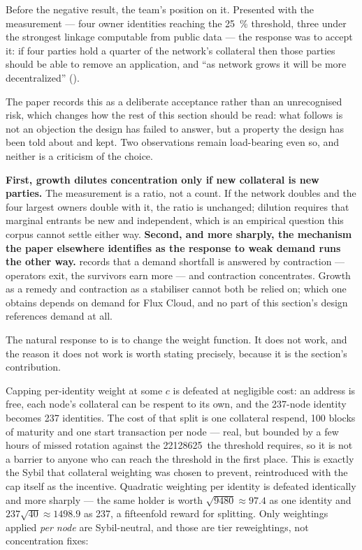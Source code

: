 \begin{remark}
\label{rem:23:accepted}
Before the negative result, the team's position on it. Presented with the measurement --- four owner
identities reaching the \SI{25}{\percent} threshold, three under the strongest linkage computable
from public data --- the response was to accept it: if four parties hold a quarter of the network's
collateral then those parties should be able to remove an application, and ``as network grows it will
be more decentralized''  (\planned).

The paper records this as a deliberate acceptance rather than an unrecognised risk, which changes how
the rest of this section should be read: what follows is not an objection the design has failed to
answer, but a property the design has been told about and kept. Two observations remain load-bearing
even so, and neither is a criticism of the choice.

\textbf{First, growth dilutes concentration only if new collateral is new parties.} The measurement
is a ratio, not a count. If the network doubles and the four largest owners double with it, the ratio
is unchanged; dilution requires that marginal entrants be new and independent, which is an empirical
question this corpus cannot settle either way. \textbf{Second, and more sharply, the mechanism the
paper elsewhere identifies as the response to weak demand runs the other way.}
 records that a demand shortfall is answered by contraction --- operators
exit, the survivors earn more --- and contraction concentrates. Growth as a remedy and contraction as
a stabiliser cannot both be relied on; which one obtains depends on demand for Flux Cloud, and no part
of this section's design references demand at all.
\end{remark}

The natural response to  is to change the weight function. It does not work,
and the reason it does not work is worth stating precisely, because it is the section's
contribution.

Capping per-identity weight at some $c$ is defeated at negligible cost: an address is free, each
node's collateral can be respent to its own, and the 237-node identity becomes 237 identities. The
cost of that split is one collateral respend, 100 blocks of maturity and one start transaction per
node  — real, but bounded by a few hours of missed rotation
against the \num{22128625}\flux\ the threshold requires, so it is not a barrier to anyone who can
reach the threshold in the first place. This is exactly the Sybil that
collateral weighting was chosen to prevent, reintroduced with the cap itself as the incentive.
Quadratic weighting per identity is defeated identically and more sharply — the same holder is
worth $\sqrt{9480} \approx 97.4$ as one identity and $237\sqrt{40} \approx 1498.9$ as 237, a
fifteenfold reward for splitting. Only weightings applied \emph{per node} are Sybil-neutral, and
those are tier reweightings, not concentration fixes:

